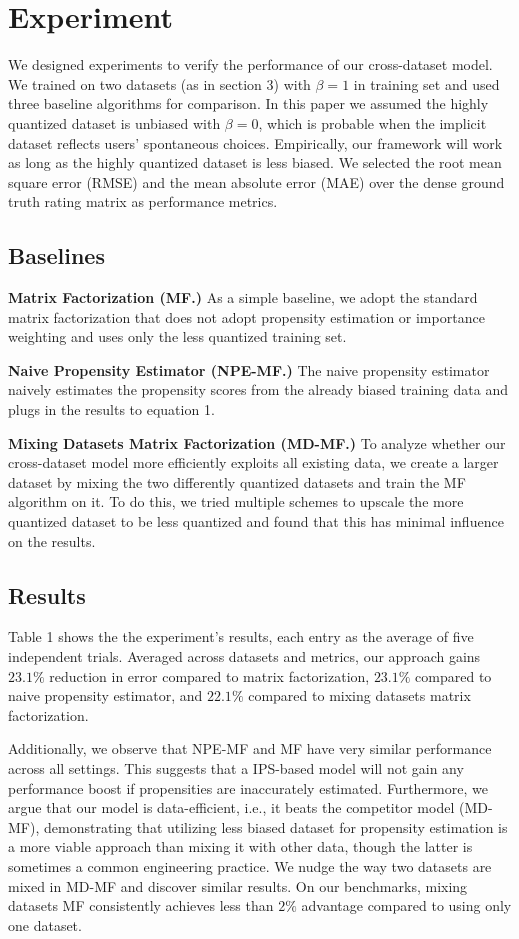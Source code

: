 \documentclass{article}
\begin{document}
\section{Experiment}
We designed experiments to verify the performance of our cross-dataset model. We trained on two datasets (as in section 3) with $\beta =1$ in training set and used three baseline algorithms for comparison. In this paper we assumed the highly quantized dataset is unbiased with $\beta=0$, which is probable when the implicit dataset reflects users' spontaneous choices. Empirically, our framework will work as long as the highly quantized dataset is less biased. We selected the root mean square error (RMSE) and the mean absolute error (MAE) over the dense ground truth rating matrix as performance metrics. 

\subsection{Baselines}
\textbf{Matrix Factorization (MF.)}
As a simple baseline, we adopt the standard matrix factorization that does not adopt propensity estimation or importance weighting and uses only the less quantized training set.

\textbf{Naive Propensity Estimator (NPE-MF.)}
The naive propensity estimator naively estimates the propensity scores from the already biased training data and plugs in the results to equation 1.

\textbf{Mixing Datasets Matrix Factorization (MD-MF.)}
To analyze whether our cross-dataset model more efficiently exploits all existing data, we create a larger dataset by mixing the two differently quantized datasets and train the MF algorithm on it. To do this, we tried multiple schemes to upscale the more quantized dataset to be less quantized and found that this has minimal influence on the results.

\subsection{Results}
Table 1 shows the the experiment's results, each entry as the average of five independent trials. Averaged across datasets and metrics, our approach gains $23.1\%$ reduction in error compared to matrix factorization, $23.1\%$ compared to naive propensity estimator, and $22.1\%$ compared to mixing datasets matrix factorization. 

Additionally, we observe that NPE-MF and MF have very similar performance across all settings. This suggests that a IPS-based model will not gain any performance boost if propensities are inaccurately estimated. Furthermore, we argue that our model is data-efficient, i.e., it beats the competitor model (MD-MF), demonstrating that utilizing less biased dataset for propensity estimation is a more viable approach than mixing it with other data, though the latter is sometimes a common engineering practice. We nudge the way two datasets are mixed in MD-MF and discover similar results. On our benchmarks, mixing datasets MF consistently achieves less than $2\%$ advantage compared to using only one dataset.
\end{document}

